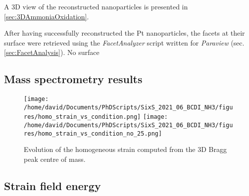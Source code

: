 A 3D view of the reconstructed nanoparticles is presented in \ref{sec:3DAmmoniaOxidation}.

After having successfully reconstructed the Pt nanoparticles, the facets at their surface were retrieved using the \textit{FacetAnalyzer} script written for \textit{Paraview} (sec. \ref{sec:FacetAnalysis}).
No surface

\subsection{Mass spectrometry results}

\begin{figure}[!htb]
    \centering
    \texttt{[image: /home/david/Documents/PhDScripts/SixS\_2021\_06\_BCDI\_NH3/figures/homo\_strain\_vs\_condition.png]}
    \texttt{[image: /home/david/Documents/PhDScripts/SixS\_2021\_06\_BCDI\_NH3/figures/homo\_strain\_vs\_condition\_no\_25.png]}
    \caption{
        Evolution of the homogeneous strain computed from the 3D Bragg peak centre of mass.
    }
    \label{fig:AmaterasuStrainSlices}
\end{figure}

\subsection{Strain field energy}


\parencite{Ellinger2008, Nolte2008, Gustafson2014, Hejral2016, Abuin2019, Kawaguchi2019, Hejral2021, Kim2021, Chung2021}